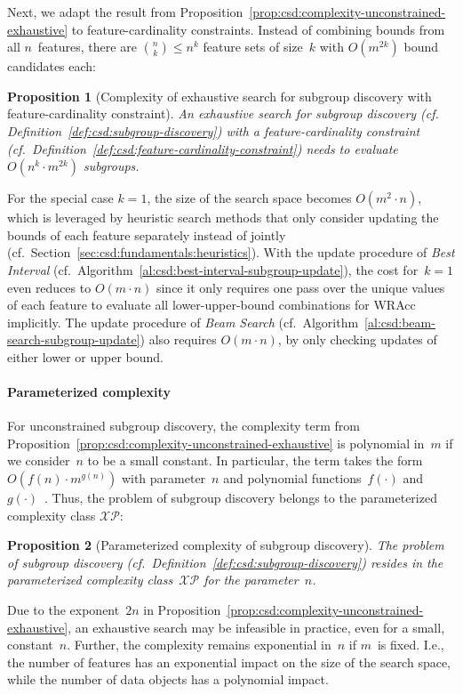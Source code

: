 \documentclass{article}
\newtheorem{proposition}{Proposition}
\theoremstyle{definition}
\begin{document}
Next, we adapt the result from Proposition~\ref{prop:csd:complexity-unconstrained-exhaustive} to feature-cardinality constraints.
Instead of combining bounds from all $n$~features, there are $\binom{n}{k} \leq n^k$ feature sets of size~$k$ with $O(m^{2k})$ bound candidates each:
%
\begin{proposition}[Complexity of exhaustive search for subgroup discovery with feature-cardinality constraint]
	An exhaustive search for subgroup discovery (cf. Definition~\ref{def:csd:subgroup-discovery}) with a feature-cardinality constraint (cf.~Definition~\ref{def:csd:feature-cardinality-constraint}) needs to evaluate $O(n^k \cdot m^{2k})$ subgroups.
	\label{prop:csd:complexity-cardinality-exhaustive}
\end{proposition}
%
For the special case $k=1$, the size of the search space becomes $O(m^2 \cdot n)$, which is leveraged by heuristic search methods that only consider updating the bounds of each feature separately instead of jointly (cf.~Section~\ref{sec:csd:fundamentals:heuristics}).
With the update procedure of \emph{Best Interval} (cf.~Algorithm~\ref{al:csd:best-interval-subgroup-update}), the cost for~$k=1$ even reduces to $O(m \cdot n)$ since it only requires one pass over the unique values of each feature to evaluate all lower-upper-bound combinations for WRAcc implicitly.
The update procedure of \emph{Beam Search} (cf.~Algorithm~\ref{al:csd:beam-search-subgroup-update}) also requires $O(m \cdot n)$, by only checking updates of either lower or upper bound.

\paragraph{Parameterized complexity}

For unconstrained subgroup discovery, the complexity term from Proposition~\ref{prop:csd:complexity-unconstrained-exhaustive} is polynomial in~$m$ if we consider~$n$ to be a small constant.
In particular, the term takes the form $O(f(n) \cdot m^{g(n)})$ with parameter~$n$ and polynomial functions~$f(\cdot)$ and~$g(\cdot)$~\cite{downey1997parameterized}.
Thus, the problem of subgroup discovery belongs to the parameterized complexity class $\mathcal{XP}$:
%
\begin{proposition}[Parameterized complexity of subgroup discovery]
	The problem of subgroup discovery (cf.~Definition~\ref{def:csd:subgroup-discovery}) resides in the parameterized complexity class~$\mathcal{XP}$ for the parameter~$n$.
	\label{prop:csd:complexity-unconstrained-xp}
\end{proposition}
%
Due to the exponent~$2n$ in Proposition~\ref{prop:csd:complexity-unconstrained-exhaustive}, an exhaustive search may be infeasible in practice, even for a small, constant~$n$.
Further, the complexity remains exponential in~$n$ if $m$~is fixed.
I.e., the number of features has an exponential impact on the size of the search space, while the number of data objects has a polynomial impact.
\end{document}
